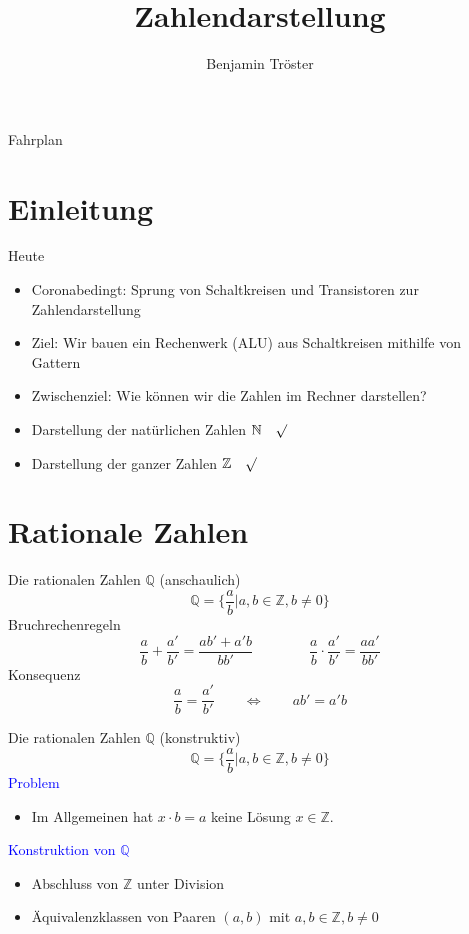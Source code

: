 \documentclass[12pt%
,aspectratio=169%
]{beamer}
\author{Benjamin Tröster}
\title[Zahlendarstellung]{Zahlendarstellung}
\institute[HTW Berlin]{Hochschule für Technik und Wirtschaft Berlin}
\begin{document}
\begin{frame}
\titlepage
\end{frame}

\begin{frame}{Fahrplan}
\tableofcontents[hideothersubsections]
\end{frame}

\section{Einleitung}
\begin{frame}{Heute}
\begin{itemize}
	\item Coronabedingt: Sprung von Schaltkreisen und Transistoren zur Zahlendarstellung
	\item Ziel: Wir bauen ein Rechenwerk (ALU) aus Schaltkreisen mithilfe von Gattern
	\item Zwischenziel: Wie können wir die Zahlen im Rechner darstellen?
	\item Darstellung der natürlichen Zahlen $\mathbb{N} \quad \surd$
	\item Darstellung der ganzer Zahlen $\mathbb{Z} \quad \surd$
\end{itemize}
\end{frame}



\section{Rationale Zahlen}
\begin{frame}{Die rationalen Zahlen $\mathbb{Q}$ (anschaulich)}
$$
	\mathbb{Q} = \Bigg\{ \frac{a}{b} | a, b \in \mathbb{Z}, b \neq 0 \Bigg\} 
$$
Bruchrechenregeln
$$
	\frac{a}{b} + \frac{a'}{b'} = \frac{ab' + a'b}{bb'} \qquad \qquad \frac{a}{b} \cdot \frac{a'}{b'} = \frac{aa'}{bb'}
$$
Konsequenz
$$
	\frac{a}{b} = \frac{a'}{b'}  \qquad \Leftrightarrow \qquad ab' = a'b
$$

\end{frame}

\begin{frame}{Die rationalen Zahlen $\mathbb{Q}$ (konstruktiv)}
$$
	\mathbb{Q} = \Bigg\{ \frac{a}{b} | a, b \in \mathbb{Z}, b \neq 0 \Bigg\} 
$$
\textcolor{blue}{Problem}
\begin{itemize}
	\item Im Allgemeinen hat $x \cdot b = a$ keine Lösung $x \in \mathbb{Z}$.
\end{itemize}
\textcolor{blue}{Konstruktion von $\mathbb{Q}$}
	\begin{itemize}
		\item Abschluss von $\mathbb{Z}$ unter Division
		\item Äquivalenzklassen von Paaren $(a, b)$ mit $a, b \in \mathbb{Z}, b \neq 0$
	\end{itemize}

\end{frame}
\end{document}
